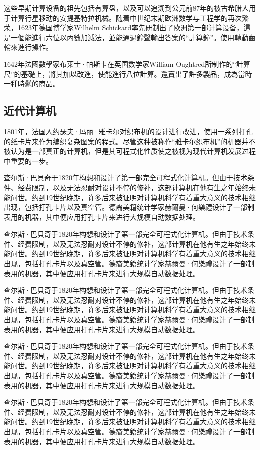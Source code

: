 \documentclass[twoside,a4paper,12pt]{book}%
\begin{document}
这些早期计算设备的祖先包括有算盘，以及可以追溯到公元前87年的被古希腊人用于计算行星移动的安提基特拉机械。随着中世纪末期欧洲数学与工程学的再次繁荣，1623年德国博学家Wilhelm Schickard率先研制出了欧洲第一部计算设备，這是一個能進行六位以內數加減法，並能通過鈴聲輸出答案的“計算鐘”。使用轉動齒輪來進行操作。

1642年法國數學家布莱士·帕斯卡在英国数学家William Oughtred所制作的“計算尺”的基礎上，將其加以改進，使能進行八位計算。還賣出了許多製品，成為當時一種時髦的商品。

\subsection{近代计算机}
1801年，法国人约瑟夫·玛丽·雅卡尔对织布机的设计进行改进，使用一系列打孔的纸卡片来作为编织复杂图案的程式。尽管这种被称作“雅卡尔织布机”的机器并不被认为是一部真正的计算机，但是其可程式化性质使之被视为现代计算机发展过程中重要的一步。

查尔斯·巴貝奇于1820年构想和设计了第一部完全可程式化计算机。但由于技术条件、经费限制，以及无法忍耐对设计不停的修补，这部计算机在他有生之年始终未能问世。约到19世纪晚期，许多后来被证明对计算机科学有着重大意义的技术相继出现，包括打孔卡片以及真空管。德裔美籍统计学家赫爾曼·何樂禮设计了一部制表用的机器，其中便应用打孔卡片来进行大规模自动数据处理。

查尔斯·巴貝奇于1820年构想和设计了第一部完全可程式化计算机。但由于技术条件、经费限制，以及无法忍耐对设计不停的修补，这部计算机在他有生之年始终未能问世。约到19世纪晚期，许多后来被证明对计算机科学有着重大意义的技术相继出现，包括打孔卡片以及真空管。德裔美籍统计学家赫爾曼·何樂禮设计了一部制表用的机器，其中便应用打孔卡片来进行大规模自动数据处理。

查尔斯·巴貝奇于1820年构想和设计了第一部完全可程式化计算机。但由于技术条件、经费限制，以及无法忍耐对设计不停的修补，这部计算机在他有生之年始终未能问世。约到19世纪晚期，许多后来被证明对计算机科学有着重大意义的技术相继出现，包括打孔卡片以及真空管。德裔美籍统计学家赫爾曼·何樂禮设计了一部制表用的机器，其中便应用打孔卡片来进行大规模自动数据处理。

查尔斯·巴貝奇于1820年构想和设计了第一部完全可程式化计算机。但由于技术条件、经费限制，以及无法忍耐对设计不停的修补，这部计算机在他有生之年始终未能问世。约到19世纪晚期，许多后来被证明对计算机科学有着重大意义的技术相继出现，包括打孔卡片以及真空管。德裔美籍统计学家赫爾曼·何樂禮设计了一部制表用的机器，其中便应用打孔卡片来进行大规模自动数据处理。

查尔斯·巴貝奇于1820年构想和设计了第一部完全可程式化计算机。但由于技术条件、经费限制，以及无法忍耐对设计不停的修补，这部计算机在他有生之年始终未能问世。约到19世纪晚期，许多后来被证明对计算机科学有着重大意义的技术相继出现，包括打孔卡片以及真空管。德裔美籍统计学家赫爾曼·何樂禮设计了一部制表用的机器，其中便应用打孔卡片来进行大规模自动数据处理。
\end{document}
